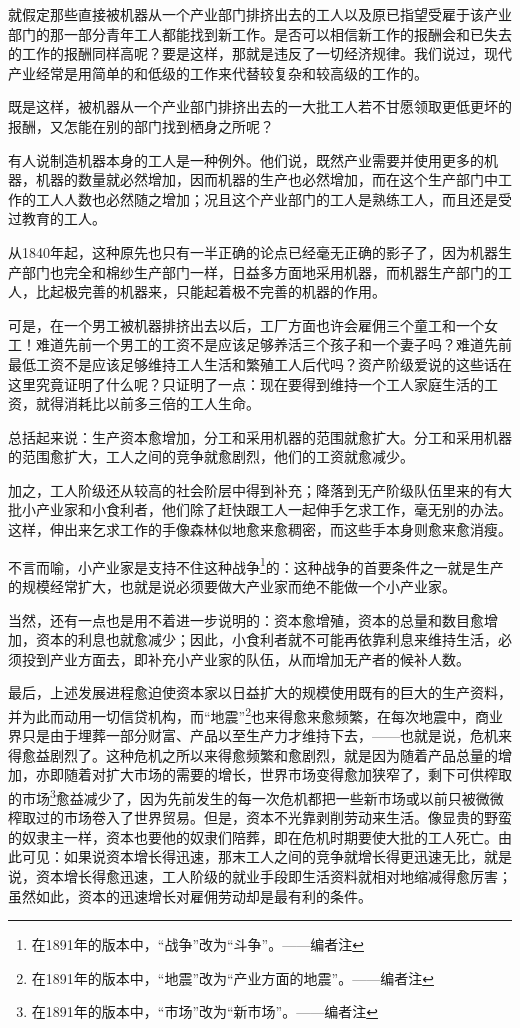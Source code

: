 \documentclass[a4paper,twoside,12pt,AutoFakeBold]{ctexart}
\begin{document}
就假定那些直接被机器从一个产业部门排挤出去的工人以及原已指望受雇于该产业部门的那一部分青年工人都能找到新工作。是否可以相信新工作的报酬会和已失去的工作的报酬同样高呢？要是这样，那就是违反了一切经济规律。我们说过，现代产业经常是用简单的和低级的工作来代替较复杂和较高级的工作的。

既是这样，被机器从一个产业部门排挤出去的一大批工人若不甘愿领取更低更坏的报酬，又怎能在别的部门找到栖身之所呢？

有人说制造机器本身的工人是一种例外。他们说，既然产业需要并使用更多的机器，机器的数量就必然增加，因而机器的生产也必然增加，而在这个生产部门中工作的工人人数也必然随之增加；况且这个产业部门的工人是熟练工人，而且还是受过教育的工人。

从1840年起，这种原先也只有一半正确的论点已经毫无正确的影子了，因为机器生产部门也完全和棉纱生产部门一样，日益多方面地采用机器，而机器生产部门的工人，比起极完善的机器来，只能起着极不完善的机器的作用。

可是，在一个男工被机器排挤出去以后，工厂方面也许会雇佣三个童工和一个女工！难道先前一个男工的工资不是应该足够养活三个孩子和一个妻子吗？难道先前最低工资不是应该足够维持工人生活和繁殖工人后代吗？资产阶级爱说的这些话在这里究竟证明了什么呢？只证明了一点：现在要得到维持一个工人家庭生活的工资，就得消耗比以前多三倍的工人生命。

总括起来说：生产资本愈增加，分工和采用机器的范围就愈扩大。分工和采用机器的范围愈扩大，工人之间的竞争就愈剧烈，他们的工资就愈减少。

加之，工人阶级还从较高的社会阶层中得到补充；降落到无产阶级队伍里来的有大批小产业家和小食利者，他们除了赶快跟工人一起伸手乞求工作，毫无别的办法。这样，伸出来乞求工作的手像森林似地愈来愈稠密，而这些手本身则愈来愈消瘦。

不言而喻，小产业家是支持不住这种战争\footnote{在1891年的版本中，“战争”改为“斗争”。——编者注}的：这种战争的首要条件之一就是生产的规模经常扩大，也就是说必须要做大产业家而绝不能做一个小产业家。

当然，还有一点也是用不着进一步说明的：资本愈增殖，资本的总量和数目愈增加，资本的利息也就愈减少；因此，小食利者就不可能再依靠利息来维持生活，必须投到产业方面去，即补充小产业家的队伍，从而增加无产者的候补人数。

最后，上述发展进程愈迫使资本家以日益扩大的规模使用既有的巨大的生产资料，并为此而动用一切信贷机构，而“地震”\footnote{在1891年的版本中，“地震”改为“产业方面的地震”。——编者注}也来得愈来愈频繁，在每次地震中，商业界只是由于埋葬一部分财富、产品以至生产力才维持下去，——也就是说，危机来得愈益剧烈了。这种危机之所以来得愈频繁和愈剧烈，就是因为随着产品总量的增加，亦即随着对扩大市场的需要的增长，世界市场变得愈加狭窄了，剩下可供榨取的市场\footnote{在1891年的版本中，“市场”改为“新市场”。——编者注}愈益减少了，因为先前发生的每一次危机都把一些新市场或以前只被微微榨取过的市场卷入了世界贸易。但是，资本不光靠剥削劳动来生活。像显贵的野蛮的奴隶主一样，资本也要他的奴隶们陪葬，即在危机时期要使大批的工人死亡。由此可见：如果说资本增长得迅速，那末工人之间的竞争就增长得更迅速无比，就是说，资本增长得愈迅速，工人阶级的就业手段即生活资料就相对地缩减得愈厉害；虽然如此，资本的迅速增长对雇佣劳动却是最有利的条件。
\end{document}
